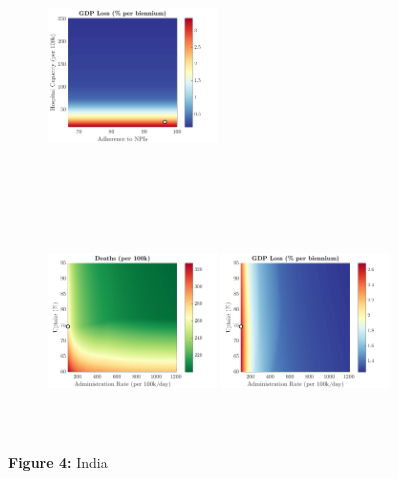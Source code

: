 \documentclass[paper=a4, fontsize=11pt]{scrartcl}
\numberwithin{figure}{section}
\numberwithin{table}{section}
\begin{document}
\begin{figure}[H]
\begin{subfigure}[b]{\textwidth}
	\hspace{0.05cm}
    	\includegraphics[width=0.49\textwidth,height=6cm]{IN/COVID/npl_g}
    \end{subfigure}
    \begin{subfigure}[b]{\textwidth}
      	\includegraphics[width=0.49\textwidth,height=6cm]{IN/COVID/imm_d}
	\hspace{0.05cm}
    	\includegraphics[width=0.49\textwidth,height=6cm]{IN/COVID/imm_g}
    \end{subfigure}
\caption*{\textbf{Figure 4:} India} 
\end{figure}
\end{document}

